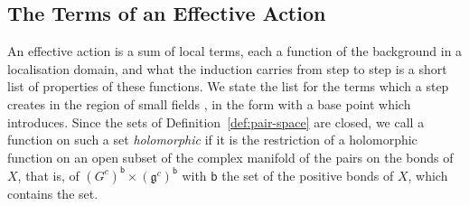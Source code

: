 \documentclass[11pt]{preprint}
\numberwithin{equation}{section}
\begin{document}
\subsection{The Terms of an Effective Action}\label{sec:terms}

An effective action is a sum of local terms, each a function of the background in a localisation domain, and what the induction carries from step to step is a short list of properties of these functions. We state the list for the terms which a step creates in the region of small fields \cite[(1.7)--(1.19), pp.~261--263]{BalabanRG1}, in the form with a base point which \cite[(2.26), (2.27), p.~259]{BalabanCRE} introduces. Since the sets of Definition~\ref{def:pair-space} are closed, we call a function on such a set \emph{holomorphic} if it is the restriction of a holomorphic function on an open subset of the complex manifold of the pairs on the bonds of $X$, that is, of $(G^c)^{\mathsf b} \times (\mathfrak g^c)^{\mathsf b}$ with $\mathsf b$ the set of the positive bonds of $X$, which contains the set.
\end{document}
